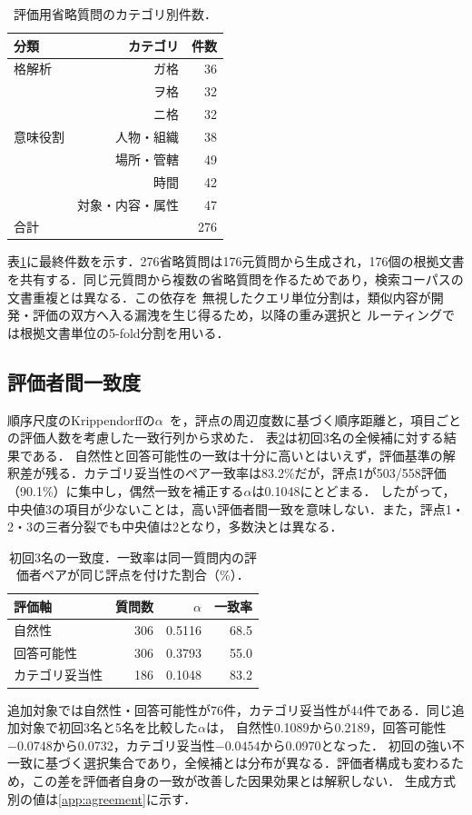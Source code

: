 \documentclass[twocolumn,a4paper,10pt]{ltjsarticle}
\begin{document}
\begin{table}[tb]
  \centering
  \caption{評価用省略質問のカテゴリ別件数．}
  \label{tab:data}
  \begin{tabular}{lrr}
    \toprule
    分類 & カテゴリ & 件数 \\
    \midrule
    格解析 & ガ格 & 36 \\
           & ヲ格 & 32 \\
           & ニ格 & 32 \\
    \midrule
    意味役割 & 人物・組織 & 38 \\
             & 場所・管轄 & 49 \\
             & 時間 & 42 \\
             & 対象・内容・属性 & 47 \\
    \midrule
    \multicolumn{2}{l}{合計} & 276 \\
    \bottomrule
  \end{tabular}
\end{table}

表\ref{tab:data}に最終件数を示す．276省略質問は176元質問から生成され，176個の根拠文書を共有する．同じ元質問から複数の省略質問を作るためであり，検索コーパスの文書重複とは異なる．この依存を
無視したクエリ単位分割は，類似内容が開発・評価の双方へ入る漏洩を生じ得るため，以降の重み選択と
ルーティングでは根拠文書単位の5-fold分割を用いる．


\subsection{評価者間一致度}
順序尺度のKrippendorffの$\alpha$~\cite{hayes2007alpha}を，評点の周辺度数に基づく順序距離と，項目ごとの評価人数を考慮した一致行列から求めた．
表\ref{tab:agreement}は初回3名の全候補に対する結果である．
自然性と回答可能性の一致は十分に高いとはいえず，評価基準の解釈差が残る．カテゴリ妥当性のペア一致率は83.2\%だが，評点1が503/558評価（90.1\%）に集中し，偶然一致を補正する$\alpha$は0.1048にとどまる．
したがって，中央値3の項目が少ないことは，高い評価者間一致を意味しない．また，評点1・2・3の三者分裂でも中央値は2となり，多数決とは異なる．
\begin{table}[tb]
\centering\small
\caption{初回3名の一致度．一致率は同一質問内の評価者ペアが同じ評点を付けた割合（\%）．}\label{tab:agreement}
\begin{tabular}{lrrr}
\toprule
評価軸 & 質問数 & $\alpha$ & 一致率 \\
\midrule
自然性 & 306 & 0.5116 & 68.5 \\
回答可能性 & 306 & 0.3793 & 55.0 \\
カテゴリ妥当性 & 186 & 0.1048 & 83.2 \\
\bottomrule
\end{tabular}
\end{table}
追加対象では自然性・回答可能性が76件，カテゴリ妥当性が44件である．同じ追加対象で初回3名と5名を比較した$\alpha$は，
自然性0.1089から0.2189，回答可能性$-0.0748$から0.0732，カテゴリ妥当性$-0.0454$から0.0970となった．
初回の強い不一致に基づく選択集合であり，全候補とは分布が異なる．評価者構成も変わるため，この差を評価者自身の一致が改善した因果効果とは解釈しない．
生成方式別の値は\ref{app:agreement}に示す．
\end{document}
